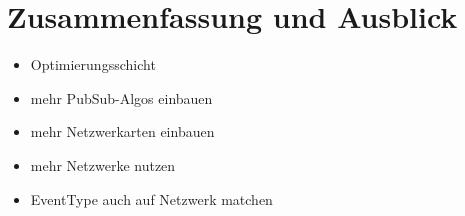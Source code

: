 \chapter{Zusammenfassung und Ausblick} 
\label{chap:zus}

\begin{itemize}
\item Optimierungsschicht
\item mehr PubSub-Algos einbauen
\item mehr Netzwerkarten einbauen
\item mehr Netzwerke nutzen
\item EventType auch auf Netzwerk matchen
\end{itemize}
